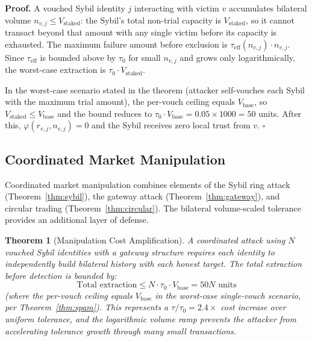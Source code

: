 \documentclass[11pt]{article}
\newtheorem{theorem}{Theorem}[section]
\newcommand{\qed}{\hfill}
\newenvironment{proof}{\noindent\textbf{Proof.}}{\qed$\square$\par\medskip}
\begin{document}
\begin{proof}
A vouched Sybil identity $j$ interacting with victim $v$ accumulates bilateral volume $n_{v,j} \leq V_{\text{staked}}$: the Sybil's total non-trial capacity is $V_{\text{staked}}$, so it cannot transact beyond that amount with any single victim before its capacity is exhausted. The maximum failure amount before exclusion is $\tau_{\text{eff}}(n_{v,j}) \cdot n_{v,j}$. Since $\tau_{\text{eff}}$ is bounded above by $\tau_0$ for small $n_{v,j}$ and grows only logarithmically, the worst-case extraction is $\tau_0 \cdot V_{\text{staked}}$.

In the worst-case scenario stated in the theorem (attacker self-vouches each Sybil with the maximum trial amount), the per-vouch ceiling equals $V_{\text{base}}$, so $V_{\text{staked}} \leq V_{\text{base}}$ and the bound reduces to $\tau_0 \cdot V_{\text{base}} = 0.05 \times 1000 = 50$ units. After this, $\varphi(r_{v,j}, n_{v,j}) = 0$ and the Sybil receives zero local trust from $v$. \qed
\end{proof}

\subsection{Coordinated Market Manipulation}

Coordinated market manipulation combines elements of the Sybil ring attack (Theorem~\ref{thm:sybil}), the gateway attack (Theorem~\ref{thm:gateway}), and circular trading (Theorem~\ref{thm:circular}). The bilateral volume-scaled tolerance provides an additional layer of defense.

\begin{theorem}[Manipulation Cost Amplification]\label{thm:manipulation}
A coordinated attack using $N$ vouched Sybil identities with a gateway structure requires each identity to independently build bilateral history with each honest target. The total extraction before detection is bounded by:
\begin{equation}
    \text{Total extraction} \leq N \cdot \tau_0 \cdot V_{\text{base}} = 50N \text{ units}
\end{equation}
(where the per-vouch ceiling equals $V_{\text{base}}$ in the worst-case single-vouch scenario, per Theorem~\ref{thm:spam}). This represents a $\tau / \tau_0 = 2.4\times$ cost increase over uniform tolerance, and the logarithmic volume ramp prevents the attacker from accelerating tolerance growth through many small transactions.
\end{theorem}
\end{document}
